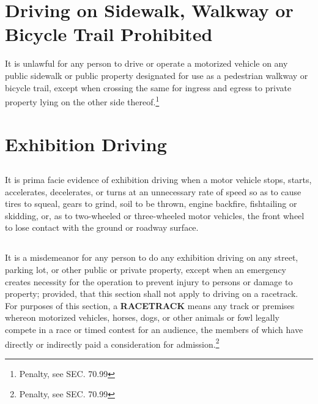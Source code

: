 \section{Driving on Sidewalk, Walkway or Bicycle Trail Prohibited}
It is unlawful for any person to drive or operate a motorized vehicle on any public sidewalk or public property designated for use as a pedestrian walkway or bicycle trail, except when crossing the same for ingress and egress to private property lying on the other side thereof.\footnote{Penalty, see SEC. 70.99}

\section{Exhibition Driving}
\subsection{}
It is prima facie evidence of exhibition driving when a motor vehicle stops, starts, accelerates, decelerates, or turns at an unnecessary rate of speed so as to cause tires to squeal, gears to grind, soil to be thrown, engine backfire, fishtailing or skidding, or, as to two-wheeled or three-wheeled motor vehicles, the front wheel to lose contact with the ground or roadway surface.
\subsection{}
It is a misdemeanor for any person to do any exhibition driving on any street, parking lot, or other public or private property, except when an emergency creates necessity for the operation to prevent injury to persons or damage to property; provided, that this section shall not apply to driving on a racetrack.  For purposes of this section, a \textbf{RACETRACK} means any track or premises whereon motorized vehicles, horses, dogs, or other animals or fowl legally compete in a race or timed contest for an audience, the members of which have directly or indirectly paid a consideration for admission.\footnote{Penalty, see SEC. 70.99}\\


\setcounter{section}{14}
